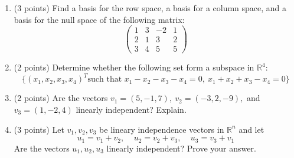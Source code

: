 \documentclass[fleqn]{article}
\begin{document}
  \begin{enumerate}
    \item (3 points) Find a basis for the row space, a basis for a column space, and a basis for the null
    space of the following matrix:
    $$
      \begin{pmatrix}
        1 & 3 & -2 & 1
        \\
        2 & 1 & 3 & 2
        \\
        3 & 4 & 5 & 5
      \end{pmatrix}
    $$

    \item (2 points) Determine whether the following set form a subspace in $\mathbb{R}^4$:
    $$
      \{ \left(x_1, x_2, x_3, x_4\right)^T \text{such that } x_1-x_2-x_3-x_4=0, ~ x_1+x_2+x_3-x_4=0 \} 
    $$

    \item (2 points) Are the vectors $v_1=(5, -1, 7), ~ v_2=(-3, 2, -9),$ and $v_3=(1, -2, 4)$ linearly independent? Explain.
    

    \item (3 points) Let $v_1, v_2, v_3$ be lineary independence vectors in $\mathbb{R}^n$ and let
    $$
      u_1=v_1+v_2, ~~~~~ u_2=v_2+v_3, ~~~~~ u_3=v_3+v_1
    $$
    Are the vectors $u_1, u_2, u_3$ linearly independent? Prove your answer.
  \end{enumerate}
\end{document}
